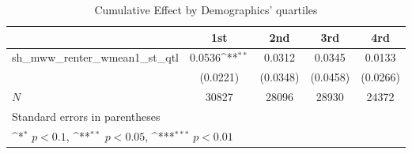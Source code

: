 \begin{table}[htbp]\centering
\def\sym#1{\ifmmode^{#1}\else\(^{#1}\)\fi}
\caption{Cumulative Effect by Demographics' quartiles}
\begin{tabular}{l*{4}{c}}
\hline\hline
            &\multicolumn{1}{c}{1st}&\multicolumn{1}{c}{2nd}&\multicolumn{1}{c}{3rd}&\multicolumn{1}{c}{4rd}\\
\hline
sh\_mww\_renter\_wmean1\_st\_qtl&      0.0536\sym{**} &      0.0312         &      0.0345         &      0.0133         \\
            &    (0.0221)         &    (0.0348)         &    (0.0458)         &    (0.0266)         \\
\hline
\(N\)       &       30827         &       28096         &       28930         &       24372         \\
\hline\hline
\multicolumn{5}{l}{\footnotesize Standard errors in parentheses}\\
\multicolumn{5}{l}{\footnotesize \sym{*} \(p<0.1\), \sym{**} \(p<0.05\), \sym{***} \(p<0.01\)}\\
\end{tabular}
\end{table}
